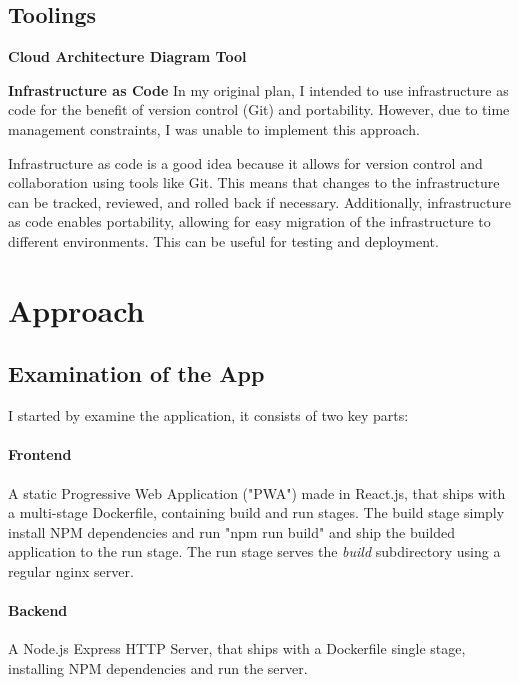 \documentclass[11pt]{article}
\begin{document}
\subsection{Toolings}

\textbf{Cloud Architecture Diagram Tool}



\textbf{Infrastructure as Code}\newline
In my original plan, I intended to use infrastructure as code for the benefit of version control (Git) and portability. However, due to time management constraints, I was unable to implement this approach.

Infrastructure as code is a good idea because it allows for version control and collaboration using tools like Git. This means that changes to the infrastructure can be tracked, reviewed, and rolled back if necessary. Additionally, infrastructure as code enables portability, allowing for easy migration of the infrastructure to different environments. This can be useful for testing and deployment.

\section{Approach}

\subsection{Examination of the App}
I started by examine the application, it consists of two key parts:

\paragraph{Frontend}
A static Progressive Web Application ("PWA") made in React.js, that ships with a multi-stage Dockerfile, containing build and run stages. The build stage simply install NPM dependencies and run "npm run build" and ship the builded application to the run stage. The run stage serves the \textit{build} subdirectory using a regular nginx server.

\paragraph{Backend}
A Node.js Express HTTP Server, that ships with a Dockerfile single stage, installing NPM dependencies and run the server.
\end{document}
